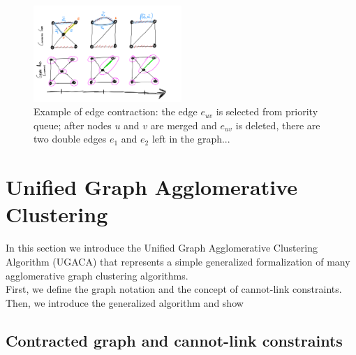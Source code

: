 
\begin{figure}
\centering
\includegraphics[width=0.50\textwidth,trim=0.1in 0.4in 0.2in 0.2in,clip]{./figs/edge_contraction.png} %
\caption{\small 
Example of edge contraction: the edge $e_{uv}$ is selected from priority queue; after nodes $u$ and $v$ are merged and $e_{uv}$ is deleted, there are two double edges $e_1$ and $e_2$ left in the graph...  
\label{fig:edge_contraction_and_contr_graph} }
\end{figure}

\section{Unified Graph Agglomerative Clustering}
In this section we introduce the Unified Graph Agglomerative Clustering Algorithm (UGACA) that represents a simple generalized formalization of many agglomerative graph clustering algorithms. \\
First, we define the graph notation and the concept of cannot-link constraints. Then, we introduce the generalized algorithm and show 

\subsection{Contracted graph and cannot-link constraints} \label{sec:contr_graph_and_CLC}

